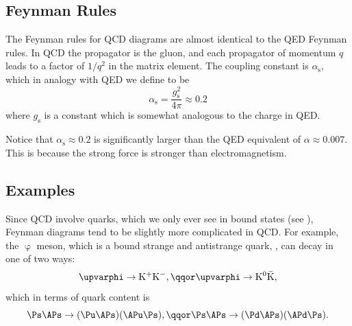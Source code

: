 \documentclass[fleqn]{NotesClass}
\makeatletter
\newcommand{\PBASE@kaon}{\mathrm{K}}
\newcommand{\PKplus}{\ensuremath{\PBASE@kaon^+}}
\newcommand{\PKminus}{\ensuremath{\PBASE@kaon^-}}
\newcommand{\PKzero}{\ensuremath{\PBASE@kaon^0}}
\newcommand{\APKzero}{\ensuremath{\bar{\PBASE@kaon}}}
\newcommand{\Pphi}{\ensuremath{\upvarphi}}
\newcommand*{\strong}{\mathrm{s}}
\makeatother
\begin{document}
    \subsection{Feynman Rules}
    The Feynman rules for QCD diagrams are almost identical to the QED Feynman rules.
    In QCD the propagator is the gluon, and each propagator of momentum \(q\) leads to a factor of \(1/q^2\) in the matrix element.
    The coupling constant is \(\alpha_{\strong}\), which in analogy with QED we define to be
    \begin{equation}
        \alpha_{\strong} = \frac{g_{\strong}^2}{4\pi} \approx 0.2
    \end{equation}
    where \(g_{\strong}\) is a constant which is somewhat analogous to the charge in QED.
    
    Notice that \(\alpha_{\strong} \approx 0.2\) is significantly larger than the QED equivalent of \(\alpha \approx 0.007\).
    This is because the strong force is stronger than electromagnetism.
    
    \subsection{Examples}
    Since QCD involve quarks, which we only ever see in bound states (see %
    ), Feynman diagrams tend to be slightly more complicated in QCD.
    For example, the \Pphi{} meson, which is a bound strange and antistrange quark, \Ps\APs, can decay in one of two ways:
    \begin{equation}
        \Pphi \to \PKplus\PKminus, \qqor \Pphi \to \PKzero\APKzero,
    \end{equation}
    which in terms of quark content is
    \begin{equation}
        \Ps\APs \to (\Pu\APs)(\APu\Ps), \qqor \Ps\APs \to (\Pd\APs)(\APd\Ps).
    \end{equation}
    
\end{document}
